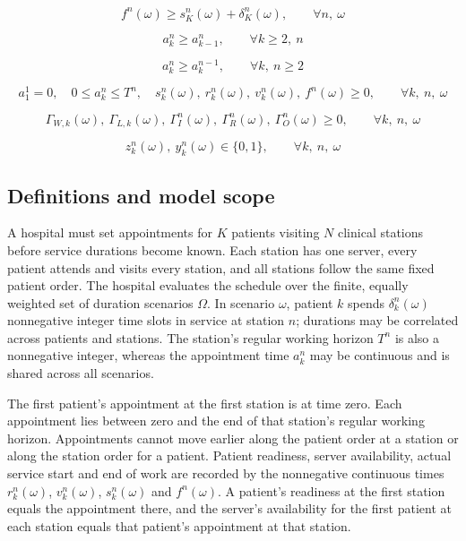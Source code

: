 \documentclass[10pt]{article}
\begin{document}
\begin{equation}
f^n(\omega) \ge s_K^n(\omega) + \delta_K^n(\omega),
\qquad \forall n,\ \omega
\tag{23}
\end{equation}

\begin{equation}
a_k^n \ge a_{k-1}^n,
\qquad \forall k \ge 2,\ n
\tag{24}
\end{equation}

\begin{equation}
a_k^n \ge a_k^{n-1},
\qquad \forall k,\ n \ge 2
\tag{25}
\end{equation}

\begin{equation}
a_1^1 = 0,\quad
0 \le a_k^n \le T^n,\quad
s_k^n(\omega),\ r_k^n(\omega),\ v_k^n(\omega),\ f^n(\omega) \ge 0,
\qquad \forall k,\ n,\ \omega
\tag{26a}
\end{equation}

\begin{equation}
\Gamma_{W,k}(\omega),\ \Gamma_{L,k}(\omega),\ \Gamma_I^n(\omega),\ \Gamma_R^n(\omega),\ \Gamma_O^n(\omega) \ge 0,
\qquad \forall k,\ n,\ \omega
\tag{26b}
\end{equation}

\begin{equation}
z_k^n(\omega),\ y_k^n(\omega) \in \{0,1\},
\qquad \forall k,\ n,\ \omega
\tag{26c}
\end{equation}

\subsection*{Definitions and model scope}
A hospital must set appointments for $K$ patients visiting $N$ clinical stations before service durations become known. Each station has one server, every patient attends and visits every station, and all stations follow the same fixed patient order. The hospital evaluates the schedule over the finite, equally weighted set of duration scenarios $\Omega$. In scenario $\omega$, patient $k$ spends $\delta_k^n(\omega)$ nonnegative integer time slots in service at station $n$; durations may be correlated across patients and stations. The station's regular working horizon $T^n$ is also a nonnegative integer, whereas the appointment time $a_k^n$ may be continuous and is shared across all scenarios.

The first patient's appointment at the first station is at time zero. Each appointment lies between zero and the end of that station's regular working horizon. Appointments cannot move earlier along the patient order at a station or along the station order for a patient. Patient readiness, server availability, actual service start and end of work are recorded by the nonnegative continuous times $r_k^n(\omega)$, $v_k^n(\omega)$, $s_k^n(\omega)$ and $f^n(\omega)$. A patient's readiness at the first station equals the appointment there, and the server's availability for the first patient at each station equals that patient's appointment at that station.
\end{document}

